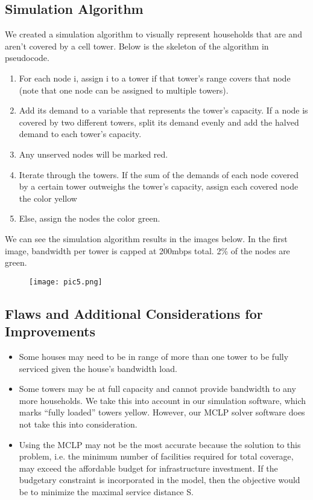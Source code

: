 	\subsection{Simulation Algorithm}
	We created a simulation algorithm to visually represent households that are and aren't covered by a cell tower. Below is the skeleton of the algorithm in pseudocode.
	\begin{enumerate}
	\item For each node i, assign i to a tower if that tower’s range covers that node (note that one node can be assigned to multiple towers).
	\item Add its demand to a variable that represents the tower’s capacity. If a node is covered by two different towers, split its demand evenly and add the halved demand to each tower’s capacity.
	\item Any unserved nodes will be marked red.
	\item Iterate through the towers. If the sum of the demands of each node covered by a certain tower outweighs the tower’s capacity, assign each covered node the color yellow
	\item Else, assign the nodes the color green.
	\end{enumerate}
	We can see the simulation algorithm results in the images below. In the first image, bandwidth per tower is capped at 200mbps total. 2\% of the nodes are green.
	\begin{figure}[h]
	\centering
	\texttt{[image: pic5.png]}
	\end{figure}
	
	\cleardoublepage
	\subsection{Flaws and Additional Considerations for Improvements}
	\begin{itemize}
	\item Some houses may need to be in range of more than one tower to be fully serviced given the house’s bandwidth load.
	\item Some towers may be at full capacity and cannot provide bandwidth to any more households. We take this into account in our simulation software, which marks “fully loaded” towers yellow. However, our MCLP solver software does not take this into consideration.
	\item Using the MCLP may not be the most accurate because the solution to this problem, i.e. the minimum number of facilities required for total coverage, may exceed the affordable budget for infrastructure investment. If the budgetary constraint is incorporated in the model, then the objective would be to minimize the maximal service distance S.
	\end{itemize}
	
